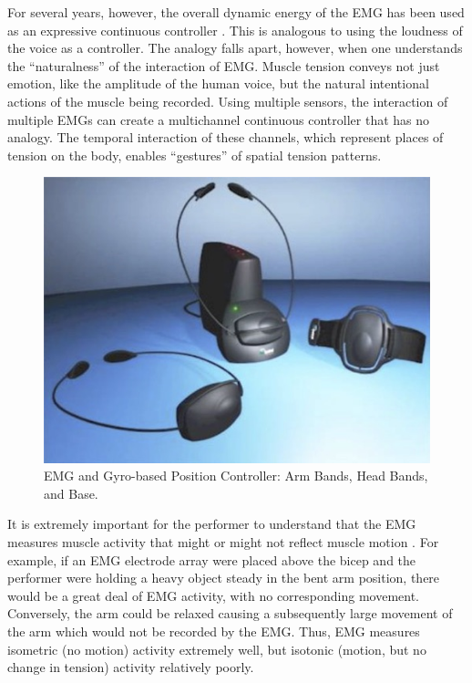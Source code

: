 For several years, however, the overall dynamic energy of the EMG has been used as an expressive continuous controller \cite{Knapp:1990,Lusted:1996}. This is analogous to using the loudness of the voice as a controller. The analogy falls apart, however, when one understands the ``naturalness'' of the interaction of EMG.  Muscle tension conveys not just emotion, like the amplitude of the human voice, but the natural intentional actions of the muscle being recorded.  Using multiple sensors, the interaction of multiple EMGs can create a multichannel continuous controller that has no analogy.  The temporal interaction of these channels, which represent places of tension on the body, enables ``gestures'' of spatial tension patterns.

\begin{figure}[!htbp]
\centering
  \includegraphics[width=\columnwidth]{figures/emginterface.jpg}
  \caption{EMG and Gyro-based Position Controller: Arm Bands, Head Bands, and Base.}
  \label{Tanaka:fig:emgcontroller}
\end{figure}

It is extremely important for the performer to understand that the EMG measures muscle activity that might or might not reflect muscle motion \cite{Tanaka:1993}.  For example, if an EMG electrode array were placed above the bicep and the performer were holding a heavy object steady in the bent arm position, there would be a great deal of EMG activity, with no corresponding movement.   Conversely, the arm could be relaxed causing a subsequently large movement of the arm which would not be recorded by the EMG. Thus, EMG measures isometric (no motion) activity extremely well, but isotonic (motion, but no change in tension) activity relatively poorly. 
 
